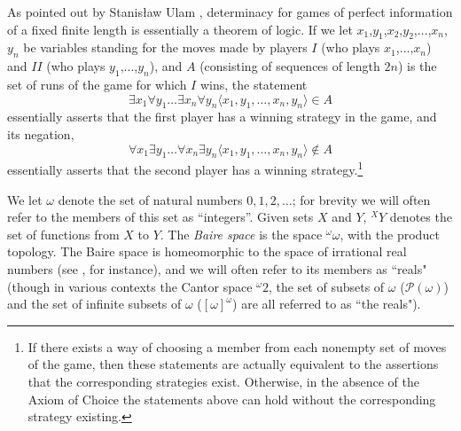 \documentclass{book}%
\newcommand{\creals}{{^{\omega}}2}
\begin{document}
As pointed out by Stanis{\l}aw Ulam ,
determinacy for games of
perfect information of a fixed finite length is essentially a
theorem of logic. If we let
$x_{1}$,$y_{1}$,$x_{2}$,$y_{2}$,$\ldots$,$x_{n}$,$y_{n}$ be
variables standing for the moves made by players $I$
(who plays $x_{1}$,$\ldots$,$x_{n}$) and $II$ (who plays $y_{1}$,$\ldots$,$y_{n}$), and
$A$ (consisting of sequences of length $2n$) is the set of runs of
the game for which $I$ wins, the statement $$\exists x_{1} \forall
y_{1} \ldots \exists x_{n} \forall y_{n} \langle
x_{1},y_{1},\ldots,x_{n},y_{n} \rangle \in A$$ essentially asserts
that the first player has a winning strategy in the game, and its
negation, $$\forall x_{1} \exists y_{1} \ldots \forall x_{n} \exists
y_{n} \langle x_{1},y_{1},\ldots,x_{n},y_{n}\rangle \not\in A$$
essentially asserts that the second player has a winning strategy.\footnote{
If there exists a way of choosing a member from each nonempty set of moves of the game, then
these statements are actually equivalent to the assertions that the
corresponding strategies exist. Otherwise, in the absence of the Axiom of Choice
the statements above can hold without the
corresponding strategy existing.}

We let $\omega$ denote the set of natural numbers $0,1,2,\ldots$; for brevity we will often refer to the members of this set as ``integers''.
Given sets $X$ and $Y$, ${^{X}}Y$ denotes the set of functions
from $X$ to $Y$. The \emph{Baire space} is the space ${^{\omega}}\omega$, with the product topology.
The Baire space is homeomorphic to the space of irrational real numbers (see \cite[p.~9]{Moschovakis:DST09}, for instance),
and we will often refer to its members as ``reals" (though in various contexts
the Cantor space $\creals$, the set of subsets of $\omega$ ($\mathcal{P}(\omega)$) and the set of infinite subsets of $\omega$ ($[\omega]^{\omega}$) are all referred to as ``the reals").
\end{document}
